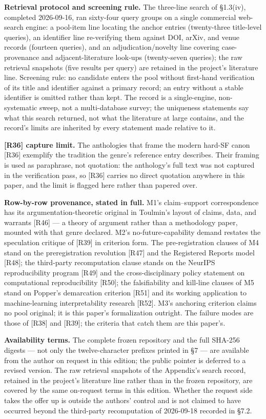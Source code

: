 \documentclass[11pt,a4paper]{article}
\begin{document}
\textbf{Retrieval protocol and screening rule.} The three-line search of §1.3(iv), completed 2026-09-16, ran sixty-four query groups on a single commercial web-search engine: a pool-item line locating the anchor entries (twenty-three title-level queries), an identifier line re-verifying them against DOI, arXiv, and venue records (fourteen queries), and an adjudication/novelty line covering case-provenance and adjacent-literature look-ups (twenty-seven queries); the raw retrieval snapshots (five results per query) are retained in the project's literature line. Screening rule: no candidate enters the pool without first-hand verification of its title and identifier against a primary record; an entry without a stable identifier is omitted rather than kept. The record is a single-engine, non-systematic sweep, not a multi-database survey; the uniqueness statements say what this search returned, not what the literature at large contains, and the record's limits are inherited by every statement made relative to it.

\textbf{[R36] capture limit.} The anthologies that frame the modern hard-SF canon [R36] exemplify the tradition the genre's reference entry describes. Their framing is used as paraphrase, not quotation: the anthology's full text was not captured in the verification pass, so [R36] carries no direct quotation anywhere in this paper, and the limit is flagged here rather than papered over.

\textbf{Row-by-row provenance, stated in full.} M1's claim–support correspondence has its argumentation-theoretic original in Toulmin's layout of claims, data, and warrants [R46] — a theory of argument rather than a methodology paper, mounted with that genre declared. M2's no-future-capability demand restates the speculation critique of [R39] in criterion form. The pre-registration clauses of M4 stand on the preregistration revolution [R47] and the Registered Reports model [R48]; the third-party recomputation clause stands on the NeurIPS reproducibility program [R49] and the cross-disciplinary policy statement on computational reproducibility [R50]; the falsifiability and kill-line clauses of M5 stand on Popper's demarcation criterion [R51] and its working application to machine-learning interpretability research [R52]. M3's anchoring criterion claims no pool original; it is this paper's formalization outright. The failure modes are those of [R38] and [R39]; the criteria that catch them are this paper's.

\textbf{Availability terms.} The complete frozen repository and the full SHA-256 digests — not only the twelve-character prefixes printed in §7 — are available from the author on request in this edition; the public pointer is deferred to a revised version. The raw retrieval snapshots of the Appendix's search record, retained in the project's literature line rather than in the frozen repository, are covered by the same on-request terms in this edition. Whether the request side takes the offer up is outside the authors' control and is not claimed to have occurred beyond the third-party recomputation of 2026-09-18 recorded in §7.2.
\end{document}
